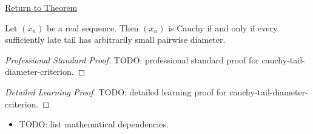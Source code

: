\newpage
{}
\label{prf:cauchy-tail-diameter-criterion}

\begin{remark*}[Return]
\hyperref[thm:cauchy-tail-diameter-criterion]{Return to Theorem}
\end{remark*}

\begin{theorem*}
Let $(x_n)$ be a real sequence. Then $(x_n)$ is Cauchy if and only if
every sufficiently late tail has arbitrarily small pairwise diameter.

\smallskip
\noindent
\end{theorem*}

\begin{proof}[Professional Standard Proof]
\LRAProofBodyStart
TODO: professional standard proof for cauchy-tail-diameter-criterion.
\end{proof}

\begin{proof}[Detailed Learning Proof]
\LRAProofBodyStart
TODO: detailed learning proof for cauchy-tail-diameter-criterion.
\end{proof}

\begin{remark*}
\end{remark*}

\begin{dependencies}
\begin{itemize}
  \item TODO: list mathematical dependencies.
\end{itemize}
\end{dependencies}

\clearpage
